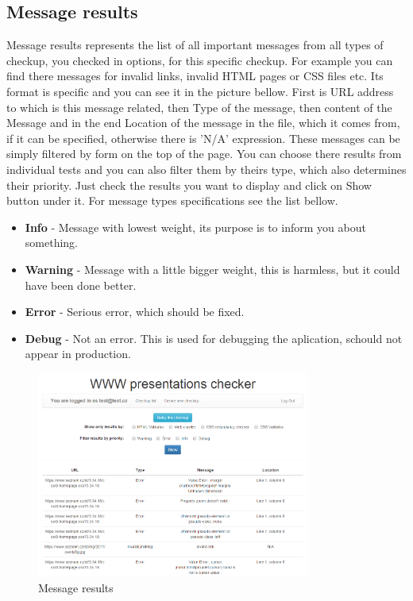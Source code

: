 \documentclass[12pt,a4paper]{article}
\begin{document}
\subsection{Message results} \label{messages}
Message results represents the list of all important messages from all types of checkup, you checked in options, for this specific checkup. For example you can find there messages for invalid links, invalid HTML pages or CSS files etc. Its format is specific and you can see it in the picture bellow. First is URL address to which is this message related, then Type of the message, then content of the Message and in the end Location of the message in the file, which it comes from, if it can be specified, otherwise there is 'N/A' expression. These messages can be simply filtered by form on the top of the page. You can choose there results from individual tests and you can also filter them by theirs type, which also determines their priority. Just check the results you want to display and click on Show button under it. For message types specifications see the list bellow.
\begin{itemize}
	\item \textbf{Info} - Message with lowest weight, its purpose is to inform you about something.
	\item \textbf{Warning} - Message with a little bigger weight, this is harmless, but it could have been done better.
	\item \textbf{Error} - Serious error, which should be fixed.
	\item \textbf{Debug} - Not an error. This is used for debugging the aplication, schould not appear in production.
\end{itemize}

\begin{figure}[H]
    \centering
    \includegraphics[width=0.8\textwidth]{pictures/messages.png}
		\caption{Message results}
		\label{fig:messages}
\end{figure}
\end{document}
